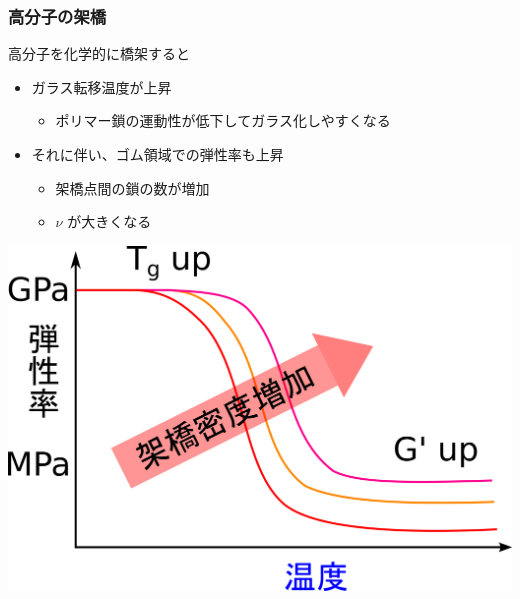 \documentclass[12pt, dvipdfmx]{beamer}
\begin{document}
\begin{frame}
	\frametitle{高分子の架橋}
			\begin{exampleblock}{高分子を化学的に橋架すると}
					\begin{itemize}
						\item ガラス転移温度が上昇
						\begin{itemize}
							\item ポリマー鎖の運動性が低下してガラス化しやすくなる
						\end{itemize}
						\item それに伴い、ゴム領域での弾性率も上昇
						\begin{itemize}
							\item 架橋点間の鎖の数が増加
							\item $\nu$ が大きくなる
						\end{itemize}
					\end{itemize}
						\centering
						\includegraphics[width=.45\textwidth]{polymer_spectrum_3.png}
			\end{exampleblock}
\end{frame}
\end{document}
